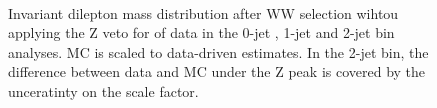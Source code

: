 \begin{figure}[!hbtp]
\centering
{}
\\
\caption{Invariant dilepton mass distribution after WW selection wihtou applying the Z veto for \intlumi of data in the 0-jet , 
1-jet  and 2-jet  bin analyses. 
MC is scaled to data-driven estimates. In the 2-jet bin, the difference between data and MC under the Z peak is 
covered by the unceratinty on the scale factor.}
\label{fig:ww_dilmass_nozveto}
\end{figure}


